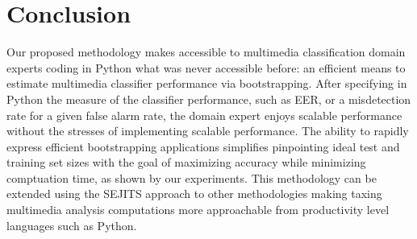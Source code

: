 \section{Conclusion}

Our proposed methodology makes accessible to multimedia classification domain experts coding in Python what was never accessible before: an efficient means to estimate multimedia classifier performance via bootstrapping. 
After specifying in Python the measure of the classifier performance, such as EER, or a misdetection rate for a given false alarm rate, the domain expert enjoys scalable performance without the stresses of implementing scalable performance. 
The ability to rapidly express efficient bootstrapping applications simplifies pinpointing ideal test and training set sizes with the goal of maximizing accuracy while minimizing comptuation time, as shown by our experiments. 
This methodology can be extended using the SEJITS approach to other methodologies making taxing multimedia analysis computations more approachable from productivity level languages such as Python. 



